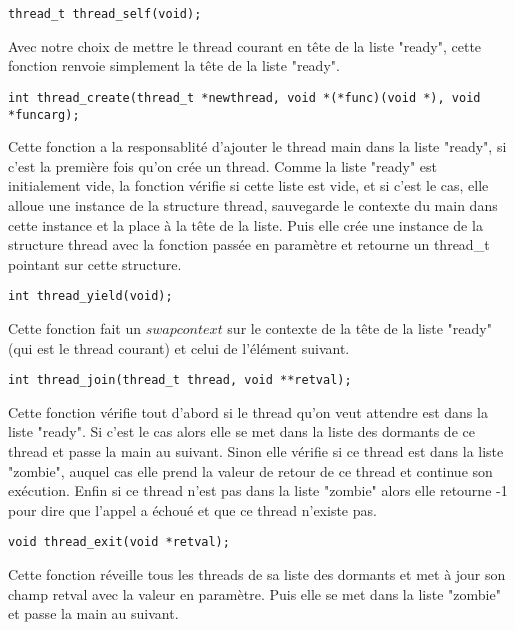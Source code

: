 \begin{verbatim}
thread_t thread_self(void);
\end{verbatim}
Avec notre choix de mettre le thread courant en tête de la liste "ready",
cette fonction renvoie simplement la tête de la liste "ready".
~~\\
\begin{verbatim}
int thread_create(thread_t *newthread, void *(*func)(void *), void *funcarg);
\end{verbatim}


Cette fonction a la responsablité d'ajouter le thread main dans la
liste "ready", si c'est la première fois qu'on crée un thread.  Comme
la liste "ready" est initialement vide, la fonction vérifie si cette
liste est vide, et si c'est le cas, elle alloue une instance de la
structure thread, sauvegarde le contexte du main dans cette instance
et la place à la tête de la liste.  Puis elle crée une instance de la
structure thread avec la fonction passée en paramètre et retourne un
thread\_t pointant sur cette structure.  ~~\\
\begin{verbatim}
int thread_yield(void);
\end{verbatim}
Cette fonction fait un $swapcontext$ sur le contexte de la tête de la
liste "ready" (qui est le thread courant) et celui de l'élément
suivant.  ~~\\
\begin{verbatim}
int thread_join(thread_t thread, void **retval);
\end{verbatim}
Cette fonction vérifie tout d'abord si le thread qu'on veut attendre
est dans la liste "ready". Si c'est le cas alors elle se met dans la
liste des dormants de ce thread et passe la main au suivant.  Sinon
elle vérifie si ce thread est dans la liste "zombie", auquel cas
elle prend la valeur de retour de ce thread et continue son exécution.
Enfin si ce thread n'est pas dans la liste "zombie" alors elle
retourne -1 pour dire que l'appel a échoué et que ce thread n'existe
pas.  ~~\\
\begin{verbatim}
void thread_exit(void *retval);
\end{verbatim}
Cette fonction réveille tous les threads de sa liste des dormants et
met à jour son champ retval avec la valeur en paramètre. Puis elle se
met dans la liste "zombie" et passe la main au suivant.
